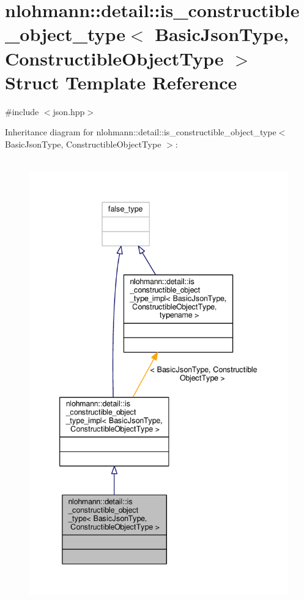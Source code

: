 \hypertarget{structnlohmann_1_1detail_1_1is__constructible__object__type}{}\section{nlohmann\+:\+:detail\+:\+:is\+\_\+constructible\+\_\+object\+\_\+type$<$ Basic\+Json\+Type, Constructible\+Object\+Type $>$ Struct Template Reference}
\label{structnlohmann_1_1detail_1_1is__constructible__object__type}


{\ttfamily \#include $<$json.\+hpp$>$}



Inheritance diagram for nlohmann\+:\+:detail\+:\+:is\+\_\+constructible\+\_\+object\+\_\+type$<$ Basic\+Json\+Type, Constructible\+Object\+Type $>$\+:
\nopagebreak
\begin{figure}[H]
\begin{center}
\leavevmode
\includegraphics[height=550pt]{structnlohmann_1_1detail_1_1is__constructible__object__type__inherit__graph}
\end{center}
\end{figure}


